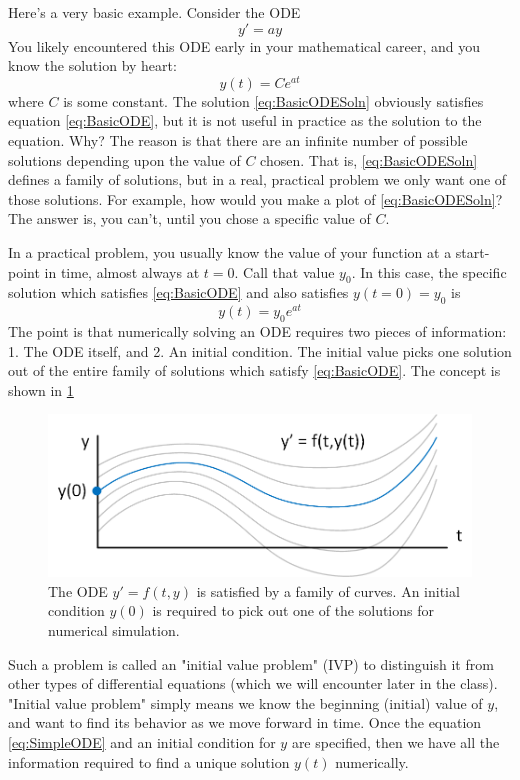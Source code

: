 \documentclass[hidelinks,notitlepage]{book}
\begin{document}
Here's a very basic example.  Consider the ODE
\begin{equation}
\label{eq:BasicODE}
y' = a y
\end{equation}
You likely encountered this ODE early in your mathematical career, and you know the solution by heart:
\begin{equation}
\label{eq:BasicODESoln}
y(t) = C e^{a t}
\end{equation}
where $C$ is some constant.  The solution \cref{eq:BasicODESoln} obviously satisfies equation \cref{eq:BasicODE}, but it is not useful in practice as the solution to the equation.  Why?  The reason is that there are an infinite number of possible solutions depending upon the value of $C$ chosen.  That is, \cref{eq:BasicODESoln} defines a family of solutions, but in a real, practical problem we only want one of those solutions.  For example, how would you make a plot of \cref{eq:BasicODESoln}?  The answer is, you can't, until you chose a specific value of $C$.  

In a practical problem, you usually know the value of your function at a start-point in time, almost always at $t = 0$.  Call that value $y_0$.  In this case, the specific solution which satisfies \cref{eq:BasicODE} and also satisfies $y(t=0) = y_0$ is
\begin{equation}
y(t) = y_0 e^{a t}
\end{equation}
The point is that numerically solving an ODE requires two pieces of information:  1.  The ODE itself, and 2.  An initial condition.  The initial value picks one solution out of the entire family of solutions which satisfy \cref{eq:BasicODE}.  The concept is shown in \cref{fig:ODEFlowLines}
\begin{figure}[tbh]
	\centering
	\includegraphics[width=0.8\columnwidth]{ODEFlowLines.png}
	\caption{The ODE $y' = f(t,y)$ is satisfied by a family of curves.  An initial condition $y(0)$ is required to pick out one of the solutions for numerical simulation. }
	\label{fig:ODEFlowLines}
\end{figure}
Such a problem is called an "initial value problem" (IVP) to distinguish it from other types of differential equations (which we will encounter later in the class).  "Initial value problem" simply means we know the beginning (initial) value of $y$, and want to find its behavior as we move forward in time.  Once the equation \ref{eq:SimpleODE} and an initial condition for $y$ are specified, then we have all the information required to find a unique solution $y(t)$ numerically.  
\end{document}
